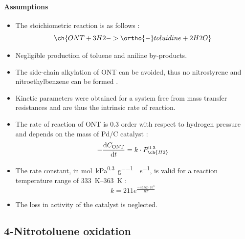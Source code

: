 \paragraph{Assumptions}
\begin{itemize}
    \item The stoichiometric reaction is as follows \cite{zhao_new_2016}:
    \begin{equation}
        \ch{ONT +  3 H2 -> \ortho{-}toluidine + 2 H2O}
    \end{equation}
    \item Negligible production of toluene and aniline by-products.  
    \item The side-chain alkylation of ONT can be avoided, thus no nitrostyrene and nitroethylbenzene can be formed \cite{zhao_new_2016}.
    \item Kinetic parameters were obtained for a system free from mass transfer resistances and are thus the intrinsic rate of reaction.
    \item The rate of reaction of ONT is 0.3 order with respect to hydrogen pressure and depends on the mass of Pd/C catalyst \cite{rajadhyaksha_solvent_1986}:
    \begin{equation}
    - \frac{\dd C_\mathrm{ONT}}{\dd t}=k \cdot P_{\ch{H2}}^{0.3} 
    \end{equation}
    \item The rate constant, in \si{\mol\per\kPa\tothe{0.3}\per\g{}\per\s}, is valid for a reaction temperature range of \SIrange{333}{363}{\K} \cite{rajadhyaksha_solvent_1986}:
    \begin{equation}
        k=211e^{\frac{-45.52\cdot 10^{3}}{RT}}
        \label{eqn:ONT_k}
    \end{equation}
    \item The loss in activity of the catalyst is neglected.
\end{itemize}

\subsection{4-Nitrotoluene oxidation}
